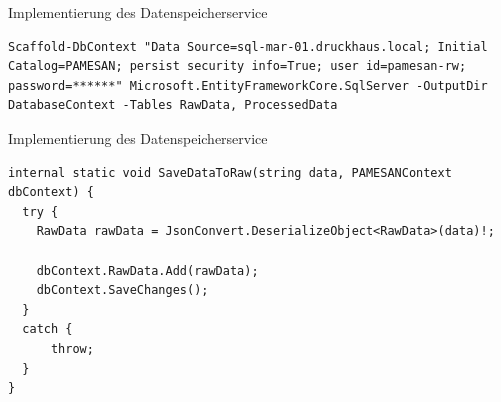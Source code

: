 \documentclass[10pt,ngerman]{beamer}
\begin{document}


\begin{frame}[fragile]{Implementierung des Datenspeicherservice}
  \begin{lstlisting}[style=bash-style,
    breaklines=true]
    Scaffold-DbContext "Data Source=sql-mar-01.druckhaus.local; Initial Catalog=PAMESAN; persist security info=True; user id=pamesan-rw; password=******" Microsoft.EntityFrameworkCore.SqlServer -OutputDir DatabaseContext -Tables RawData, ProcessedData
  \end{lstlisting}


  \pause


\end{frame}


\begin{frame}[fragile]{Implementierung des Datenspeicherservice}
  \begin{lstlisting}[style=cSharpStyle,
    breaklines=true, firstnumber=38]
internal static void SaveDataToRaw(string data, PAMESANContext dbContext) {
  try {
    RawData rawData = JsonConvert.DeserializeObject<RawData>(data)!;

    dbContext.RawData.Add(rawData);
    dbContext.SaveChanges();
  }
  catch {
      throw;
  }
}
\end{lstlisting}
\end{frame}

\end{document}
